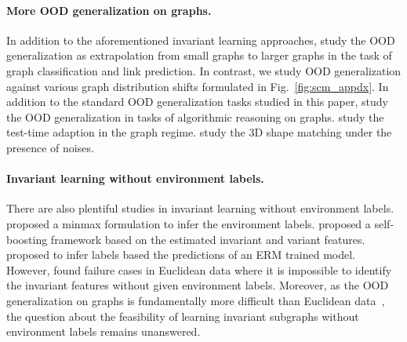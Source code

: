 \paragraph{More OOD generalization on graphs.}
In addition to the aforementioned invariant learning approaches, \citet{size_gen1,size_gen2,size_gen3} study the OOD generalization as extrapolation from small graphs to larger graphs in the task of graph classification and link prediction. In contrast, we study OOD generalization against various graph distribution shifts formulated in Fig.~\ref{fig:scm_appdx}. In addition to the standard OOD generalization tasks studied in this paper, \citet{nn_extrapo,OOD_CLRS} study the OOD generalization in tasks of algorithmic reasoning on graphs. \citet{graph_ttt} study the test-time adaption in the graph regime. \citet{shape_matching} study the 3D shape matching under the presence of noises.

\paragraph{Invariant learning without environment labels.}
There are also plentiful studies in invariant learning without environment labels.
\citet{eiil} proposed a minmax formulation to infer the environment labels.
\citet{hrm} proposed a self-boosting framework based on the estimated invariant and variant features.
\citet{jtt,cnc} proposed to infer labels based the predictions of an ERM trained model.
However, \citet{zin} found failure cases in Euclidean data
where it is impossible to identify the invariant features without given environment labels.
Moreover, as the OOD generalization on graphs is fundamentally more difficult than Euclidean data~\citep{ciga}, the question about the feasibility of learning invariant subgraphs without environment labels remains unanswered.






